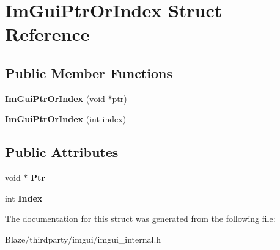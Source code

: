 \hypertarget{structImGuiPtrOrIndex}{}\section{Im\+Gui\+Ptr\+Or\+Index Struct Reference}
\label{structImGuiPtrOrIndex}
\subsection*{Public Member Functions}
\begin{DoxyCompactItemize}
\item 
\mbox{\label{structImGuiPtrOrIndex_a4dd680dd14b154bf7ad6b2c8a2ef508c}} 
{\bfseries Im\+Gui\+Ptr\+Or\+Index} (void $\ast$ptr)
\item 
\mbox{\label{structImGuiPtrOrIndex_a9a7f7991864bc7fa1447d36fc4eb5a3a}} 
{\bfseries Im\+Gui\+Ptr\+Or\+Index} (int index)
\end{DoxyCompactItemize}
\subsection*{Public Attributes}
\begin{DoxyCompactItemize}
\item 
\mbox{\label{structImGuiPtrOrIndex_a9171d3539aed08cc1ffd543c63ce2891}} 
void $\ast$ {\bfseries Ptr}
\item 
\mbox{\label{structImGuiPtrOrIndex_a72a74b99b115fd7de626170dd918e64a}} 
int {\bfseries Index}
\end{DoxyCompactItemize}


The documentation for this struct was generated from the following file\+:\begin{DoxyCompactItemize}
\item 
Blaze/thirdparty/imgui/imgui\+\_\+internal.\+h\end{DoxyCompactItemize}
